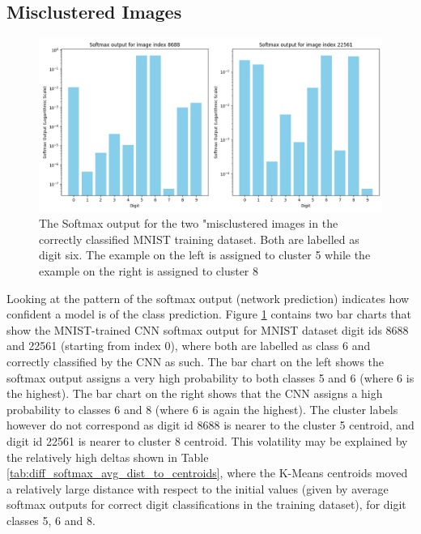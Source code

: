 
\subsection{Misclustered Images}


\begin{figure}[H]
    \centering
    \includegraphics[width=0.99\columnwidth]{Figures/8688_22561_Softmax_Output.png}
    \caption{The Softmax output for the two "misclustered images in the correctly classified MNIST training dataset. Both are labelled as digit six. The example on the left is assigned to cluster 5 while the example on the right is assigned to cluster 8}
    \label{fig:8688_22561_Softmax_Output}
\end{figure}

Looking at the pattern of the softmax output (network prediction) %
indicates how confident a model is of the class prediction. Figure \ref{fig:8688_22561_Softmax_Output} contains two bar charts that show the MNIST-trained CNN softmax output for MNIST dataset digit ids 8688 and 22561 (starting from index 0), where both are labelled as class 6 and correctly classified by the CNN as such. The bar chart on the left shows the softmax output assigns a very high probability to both classes 5 and 6 (where 6 is the highest). The bar chart on the right shows that the CNN assigns a high probability to classes 6 and 8 (where 6 is again the highest). The cluster labels however do not correspond as digit id 8688 is nearer to the cluster 5 centroid, and digit id 22561 is nearer to cluster 8 centroid. This volatility may be explained by the relatively high deltas shown in Table \ref{tab:diff_softmax_avg_dist_to_centroids}, where the K-Means centroids moved a relatively large distance with respect to the initial values (given by average softmax outputs for correct digit classifications in the training dataset), for digit classes 5, 6 and 8. 

